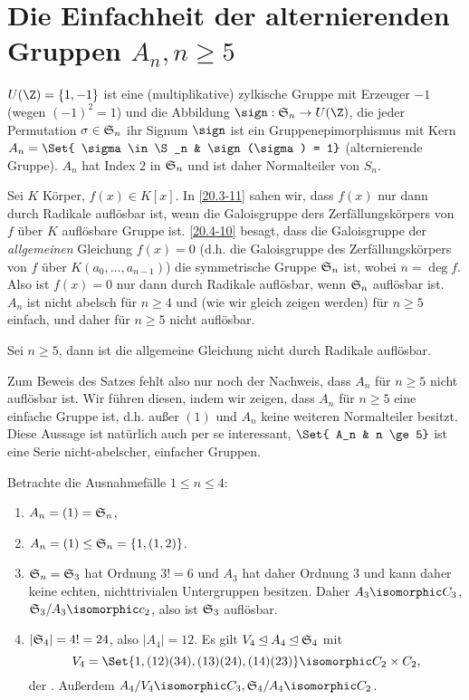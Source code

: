 
\section{Die Einfachheit der alternierenden Gruppen \texorpdfstring{$A_n, n \ge 5$}{Aₙ, n≥5}}

$U(\Z) = \{1, -1\}$ ist eine (multiplikative) zylkische Gruppe mit Erzeuger $-1$ (wegen $(-1)^2 = 1$) und die Abbildung $\sign: \S_n \to U(\Z)$, die jeder Permutation $\sigma \in \S_n$ ihr Signum $\sign$ ist ein Gruppenepimorphismus mit Kern $A_n = \Set{ \sigma \in \S_n & \sign(\sigma) = 1}$ (alternierende Gruppe).
$A_n$ hat Index $2$ in $\S_n$ und ist daher Normalteiler von $S_n$.

Sei $K$ Körper, $f(x) \in K[x]$.
In \ref{20.3-11} sahen wir, dass $f(x)$ nur dann durch Radikale auflösbar ist, wenn die Galoisgruppe ders Zerfällungskörpers von $f$ über $K$ auflösbare Gruppe ist.
\ref{20.4-10} besagt, dass die Galoisgruppe der \emph{allgemeinen} Gleichung $f(x) = 0$ (d.h. die Galoisgruppe des Zerfällungskörpers von $f$ über $K(a_0, \dotsc, a_{n-1})$) die symmetrische Gruppe $\S_n$ ist, wobei $n = \deg f$.
Also ist $f(x) = 0$ nur dann durch Radikale auflösbar, wenn $\S_n$ auflösbar ist.
$A_n$ ist nicht abelsch für $n \ge 4$ und (wie wir gleich zeigen werden) für $n \ge 5$ einfach, und daher für $n \ge 5$ nicht auflösbar.

\begin{st} \label{20.5-1}
	Sei $n \ge 5$, dann ist die allgemeine Gleichung nicht durch Radikale auflösbar.
\end{st}

Zum Beweis des Satzes fehlt also nur noch der Nachweis, dass $A_n$ für $n \ge 5$ nicht auflösbar ist.
Wir führen diesen, indem wir zeigen, dass $A_n$ für $n \ge 5$ eine einfache Gruppe ist, d.h. außer $(1)$ und $A_n$ keine weiteren Normalteiler besitzt.
Diese Aussage ist natürlich auch per se interessant, $\Set{ A_n & n \ge 5}$ ist eine Serie nicht-abelscher, einfacher Gruppen.


\begin{nt} \label{20.5-2}
	Betrachte die Ausnahmefälle $1 \le n \le 4$:
	\begin{enumerate}[{n=}1]
		\item
			$A_n = (1) = \S_n$,
		\item
			$A_n = (1) \le \S_n = \{1, (1,2) \}$.
		\item
			$\S_n = \S_3$ hat Ordnung $3! = 6$ und $A_3$ hat daher Ordnung $3$ und kann daher keine echten, nichttrivialen Untergruppen besitzen.
			Daher $A_3 \isomorphic C_3$, $\S_3 / A_3 \isomorphic c_2$, also ist $\S_3$ auflösbar.
		\item
			$|\S_4| = 4! = 24$, also $|A_4| = 12$.
			Es gilt $V_4 \NormalDivisor A_4 \NormalDivisor \S_4$ mit
			\[
				V_4 = \Set{ 1, (12)(34), (13)(24), (14)(23) } \isomorphic C_2 \times C_2,
			\]
			der .
			Außerdem $A_4 / V_4 \isomorphic C_3, \S_4 / A_4 \isomorphic C_2$.
	\end{enumerate}
\end{nt}


